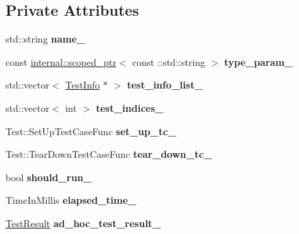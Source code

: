 \subsection*{Private Attributes}
\begin{DoxyCompactItemize}
\item 
\mbox{\label{classtesting_1_1_test_case_a6c16e28e7555dc6a158415b3bfc4f833}} 
std\+::string {\bfseries name\+\_\+}
\item 
\mbox{\label{classtesting_1_1_test_case_a4952403fca9baa20275b3fcdc28977db}} 
const \hyperlink{classtesting_1_1internal_1_1scoped__ptr}{internal\+::scoped\+\_\+ptr}$<$ const \+::std\+::string $>$ {\bfseries type\+\_\+param\+\_\+}
\item 
\mbox{\label{classtesting_1_1_test_case_adce272a48399dd67a7bdd14fa7e99b80}} 
std\+::vector$<$ \hyperlink{classtesting_1_1_test_info}{Test\+Info} $\ast$ $>$ {\bfseries test\+\_\+info\+\_\+list\+\_\+}
\item 
\mbox{\label{classtesting_1_1_test_case_a6bb04b98c46a3eecf7a4e6f62593a827}} 
std\+::vector$<$ int $>$ {\bfseries test\+\_\+indices\+\_\+}
\item 
\mbox{\label{classtesting_1_1_test_case_a272e1bcea07b9654ffc5470e64579d35}} 
Test\+::\+Set\+Up\+Test\+Case\+Func {\bfseries set\+\_\+up\+\_\+tc\+\_\+}
\item 
\mbox{\label{classtesting_1_1_test_case_a0ceb56d10b167cfc51a286a7b9b2fbbc}} 
Test\+::\+Tear\+Down\+Test\+Case\+Func {\bfseries tear\+\_\+down\+\_\+tc\+\_\+}
\item 
\mbox{\label{classtesting_1_1_test_case_a2f98fefe1f624c879e0320882c561d85}} 
bool {\bfseries should\+\_\+run\+\_\+}
\item 
\mbox{\label{classtesting_1_1_test_case_a0379c376d8832e6fd1d5d9c7c3c32759}} 
Time\+In\+Millis {\bfseries elapsed\+\_\+time\+\_\+}
\item 
\mbox{\label{classtesting_1_1_test_case_a4aec85d3398a4a0161f1cde69c07aadc}} 
\hyperlink{classtesting_1_1_test_result}{Test\+Result} {\bfseries ad\+\_\+hoc\+\_\+test\+\_\+result\+\_\+}
\end{DoxyCompactItemize}
